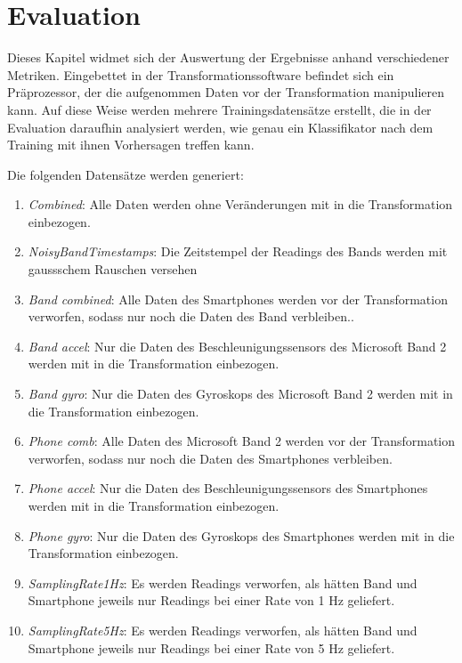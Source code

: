 \chapter{Evaluation}
\label{chap:evaluation}

Dieses Kapitel widmet sich der Auswertung der Ergebnisse anhand verschiedener Metriken. Eingebettet in der Transformationssoftware befindet sich ein Präprozessor, der die aufgenommen Daten vor der Transformation manipulieren kann. Auf diese Weise werden mehrere Trainingsdatensätze erstellt, die in der Evaluation daraufhin analysiert werden, wie genau ein Klassifikator nach dem Training mit ihnen Vorhersagen treffen kann.

Die folgenden Datensätze werden generiert:

\begin{enumerate}
\item \textit{Combined}: Alle Daten werden ohne Veränderungen mit in die Transformation einbezogen.
\item \textit{NoisyBandTimestamps}: Die Zeitstempel der Readings des Bands werden mit gaussschem Rauschen versehen
\item \textit{Band combined}: Alle Daten des Smartphones werden vor der Transformation verworfen, sodass nur noch die Daten des Band verbleiben..
\item \textit{Band accel}: Nur die Daten des Beschleunigungssensors des Microsoft Band 2 werden mit in die Transformation einbezogen.
\item \textit{Band gyro}: Nur die Daten des Gyroskops des Microsoft Band 2 werden mit in die Transformation einbezogen.
\item \textit{Phone comb}: Alle Daten des Microsoft Band 2 werden vor der Transformation verworfen, sodass nur noch die Daten des Smartphones verbleiben.
\item \textit{Phone accel}: Nur die Daten des Beschleunigungssensors des Smartphones werden mit in die Transformation einbezogen.
\item \textit{Phone gyro}: Nur die Daten des Gyroskops des Smartphones werden mit in die Transformation einbezogen.
\item \textit{SamplingRate1Hz}: Es werden Readings verworfen, als hätten Band und Smartphone jeweils nur Readings bei einer Rate von 1 Hz geliefert.
\item \textit{SamplingRate5Hz}: Es werden Readings verworfen, als hätten Band und Smartphone jeweils nur Readings bei einer Rate von 5 Hz geliefert.
\end{enumerate}

